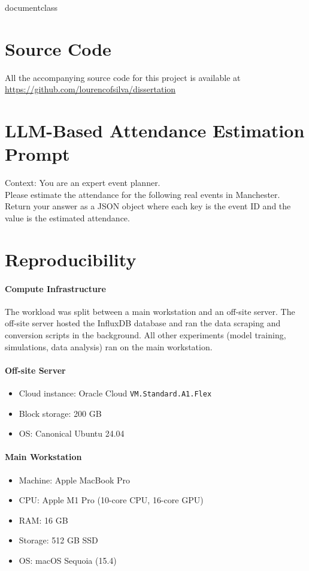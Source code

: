 \csname documentclass
\graphicspath{{\subfix{../images/}}}


\section{Source Code}
\label{appdx:a}
All the accompanying source code for this project is available at \url{https://github.com/lourencofsilva/dissertation}

\section{LLM-Based Attendance Estimation Prompt}
\label{appdx:b}
Context: You are an expert event planner. \\
Please estimate the attendance for the following real events in Manchester. \\
Return your answer as a JSON object where each key is the event ID and the value is the estimated attendance.

\section{Reproducibility}
\label{appdx:c}

\paragraph{Compute Infrastructure}
The workload was split between a main workstation and an off-site server. The off-site server hosted the InfluxDB database and ran the data scraping and conversion scripts in the background. All other experiments (model training, simulations, data analysis) ran on the main workstation.

\paragraph{Off-site Server}
\begin{itemize}
  \item Cloud instance: Oracle Cloud \texttt{VM.Standard.A1.Flex}
  \item Block storage: 200 GB
  \item OS: Canonical Ubuntu 24.04
\end{itemize}

\paragraph{Main Workstation}
\begin{itemize}
  \item Machine: Apple MacBook Pro
  \item CPU: Apple M1 Pro (10-core CPU, 16-core GPU)
  \item RAM: 16 GB
  \item Storage: 512 GB SSD
  \item OS: macOS Sequoia (15.4)
\end{itemize}


